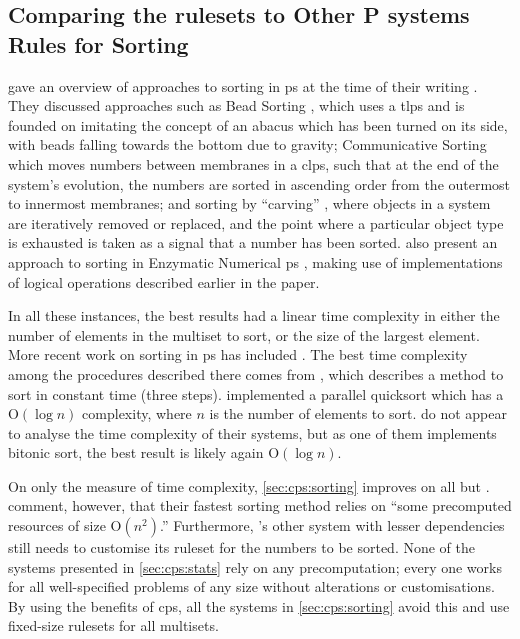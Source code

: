 \subsection{Comparing the  \Glspl{ruleset} to Other P systems Rules for Sorting}

\citeauthor{Ceterchi2010} gave an overview of approaches to sorting in \gls{ps} at the time of their writing \cite{Ceterchi2010}.  They discussed approaches such as Bead Sorting \cite{Arulanandham2002}, which uses a \gls{tlps} and is founded on imitating the concept of an abacus which has been turned on its side, with beads falling towards the bottom due to gravity; Communicative Sorting \cite[Sec. 5.2]{Alhazov2007} which moves numbers between membranes in a \gls{clps}, such that at the end of the system's evolution, the numbers are sorted in ascending order from the outermost to innermost membranes; and sorting by ``carving'' \cite{Alhazov2007}, where objects in a system are iteratively removed or replaced, and the point where a particular object type is exhausted is taken as a signal that a number has been sorted.  \citeauthor{Maeda2014} also present an approach to sorting in Enzymatic Numerical \gls{ps} \cite{Maeda2014}, making use of implementations of logical operations described earlier in the paper.

In all these instances, the best results had a linear time complexity in either the number of elements in the multiset to sort, or the size of the largest element.  More recent work on sorting in \gls{ps} has included \cite{Gheorghe2017,Metta2015,Yan2019}.  The best time complexity among the procedures described there comes from \cite[Sec. 3.3]{Gheorghe2017}, which describes a method to sort in constant time (three steps).  \citeauthor{Yan2019} \cite{Yan2019} implemented a parallel quicksort which has a O\((\log n)\) complexity, where \(n\) is the number of elements to sort.  \citeauthor{Metta2015} \cite{Metta2015} do not appear to analyse the time complexity of their systems, but as one of them implements bitonic sort, the best result is likely again O\((\log n)\).

On only the measure of time complexity, \cref{sec:cps:sorting} improves on all but \cite{Gheorghe2017}.  \citeauthor{Gheorghe2017} comment, however, that their fastest sorting method relies on ``some precomputed resources of size O\((n^2)\).''  Furthermore, \cite{Gheorghe2017}'s other system with lesser dependencies still needs to customise its \gls{ruleset} for the numbers to be sorted.  None of the systems presented in \cref{sec:cps:stats} rely on any precomputation; every one works for all well-specified problems of any size without alterations or customisations.  By using the benefits of \gls{cps}, all the systems in \cref{sec:cps:sorting} avoid this and use fixed-size \glspl{ruleset} for all multisets.

